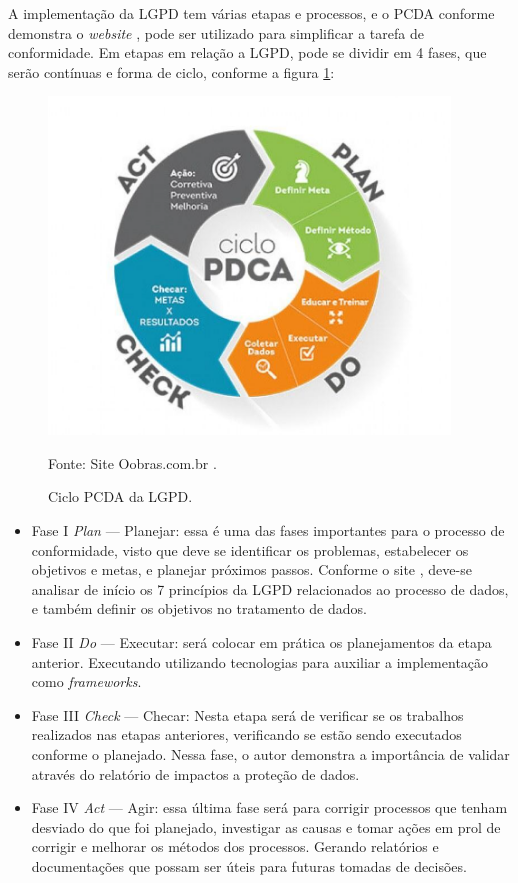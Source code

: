 \documentclass[
	12pt,				%
	openright,			%
	oneside,			%
	a4paper,			%
	english,			%
	french,				%
	spanish,			%
	brazil,				%
	]{abntex2}
\begin{document}
A implementação da LGPD tem várias etapas e processos, e o PCDA conforme demonstra o \textit{website} \cite{minutoseguraca}, pode ser utilizado para simplificar a tarefa de conformidade. Em etapas em relação a LGPD, pode se dividir em 4 fases, que serão contínuas e forma de ciclo, conforme a figura \ref{fig: PCDA }:

\begin{figure}[ht]
    \centering
    \caption{Ciclo PCDA da LGPD.}
    \includegraphics[width=4.2in]{Images/05PCDA.png}
    
    \label{fig: PCDA }
    \centering \small Fonte: Site Oobras.com.br \cite{oobras}.
\end{figure}

\begin{itemize}
\item Fase I  \textit{Plan} — Planejar: essa é uma das fases importantes para o processo de conformidade, visto que deve se identificar os problemas, estabelecer os objetivos e metas, e planejar próximos passos. Conforme o site , deve-se analisar de início os 7 princípios da LGPD relacionados ao processo de dados, e também definir os objetivos no tratamento de dados.
\item Fase II \textit{Do} — Executar: será colocar em prática os planejamentos da etapa anterior. Executando utilizando tecnologias para auxiliar a implementação como \textit{frameworks}.
\item Fase III \textit{Check} — Checar: Nesta etapa será de verificar se os trabalhos realizados nas etapas anteriores, verificando se estão sendo executados conforme o planejado. Nessa fase, o autor demonstra a importância de validar através do relatório de impactos a proteção de dados.
\item Fase IV \textit{Act} — Agir:  essa última fase será para corrigir processos que tenham desviado do que foi planejado, investigar as causas e tomar ações em prol de corrigir e melhorar os métodos dos processos. Gerando relatórios e documentações que possam ser úteis para futuras tomadas de decisões.
\end{itemize}
\end{document}
